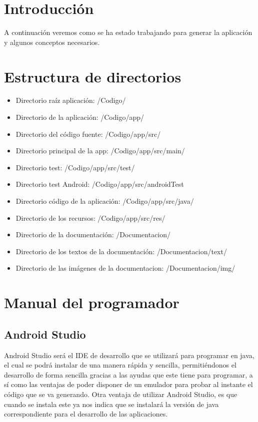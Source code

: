 
\section{Introducción}
A continuación veremos como se ha estado trabajando para generar la aplicación y algunos conceptos necesarios.
\section{Estructura de directorios}

\begin{itemize}
	\item Directorio raíz aplicación: /Codigo/
	\item Directorio de la aplicación: /Codigo/app/
	\item Directorio del código fuente: /Codigo/app/src/
	\item Directorio principal de la app: /Codigo/app/src/main/
	\item Directorio test: /Codigo/app/src/test/
	\item Directorio test Android: /Codigo/app/src/androidTest
	\item Directorio código de la aplicación: /Codigo/app/src/java/
	\item Directorio de los recursos: /Codigo/app/src/res/
	\item Directorio de la documentación: /Documentacion/
	\item Directorio de los textos de la documentación: /Documentacion/text/
	\item Directorio de las imágenes de la documentacion: /Documentacion/img/
\end{itemize}

\section{Manual del programador}
\subsection{Android Studio}
Android Studio\cite{astudio} será el IDE de desarrollo que se utilizará para programar en java, el cual se podrá instalar de una manera rápida y sencilla, permitiéndonos el desarrollo de forma sencilla gracias a las ayudas que este tiene para programar, a sí como las ventajas de poder disponer de un emulador para probar al instante el código que se va generando.
Otra ventaja de utilizar Android Studio, es que cuando se instala este ya nos indica que se instalará la versión de java correspondiente para el desarrollo de las aplicaciones.

